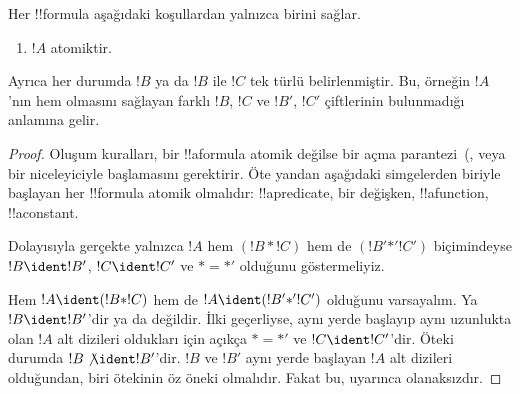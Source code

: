 \documentclass[../../../include/open-logic-section]{subfiles}
\begin{document}
\begin{prop}
Her !!{formula} aşağıdaki koşullardan yalnızca birini sağlar.
\begin{enumerate}
\item $!A$ atomiktir.







\end{enumerate}
Ayrıca her durumda $!B$ ya da $!B$ ile $!C$ tek türlü belirlenmiştir.
Bu, örneğin $!A$'nın hem
 {
     {
      }}
olmasını sağlayan farklı $!B$, $!C$ ve $!B'$, $!C'$ çiftlerinin
bulunmadığı anlamına gelir.
\end{prop}

\begin{proof}
Oluşum kuralları, bir !!a{formula} atomik değilse bir açma
parantezi~(,  veya bir niceleyiciyle başlamasını
gerektirir. Öte yandan aşağıdaki simgelerden biriyle başlayan her
!!{formula} atomik olmalıdır: !!a{predicate}, bir değişken,
!!a{function}, !!a{constant}.

Dolayısıyla gerçekte yalnızca $!A$ hem $(!B \ast !C)$ hem de $(!B'
\mathbin{\ast'} !C')$ biçimindeyse $!B \ident !B'$, $!C \ident !C'$ ve
$\ast = {\ast'}$ olduğunu göstermeliyiz.

Hem $!A \ident (!B \ast !C)$ hem de $!A \ident (!B'
\mathbin{\ast'} !C')$ olduğunu varsayalım. Ya $!B \ident !B'$'dir ya
da değildir. İlki geçerliyse, aynı yerde başlayıp aynı uzunlukta olan
$!A$ alt dizileri oldukları için açıkça $\ast = {\ast'}$ ve
$!C \ident !C'$'dir. Öteki durumda $!B \not\ident !B'$'dir. $!B$ ve
$!B'$ aynı yerde başlayan $!A$ alt dizileri olduğundan, biri ötekinin
öz öneki olmalıdır. Fakat bu,  uyarınca olanaksızdır.
\end{proof}
\end{document}
